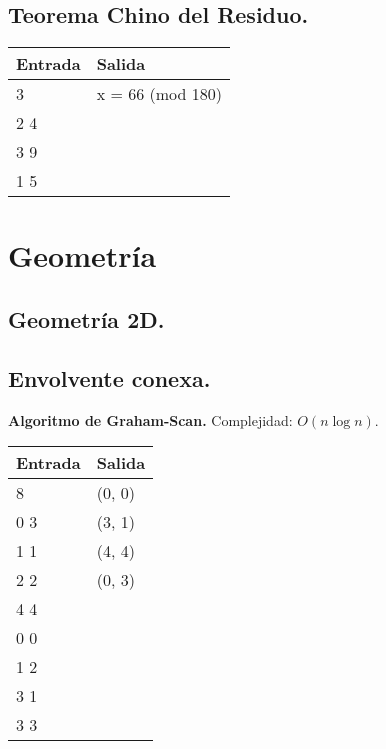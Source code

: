 \documentclass[10pt, letterpaper, twoside]{article}
\begin{document}
\subsection{Teorema Chino del Residuo.}



\begin{tabular}{|p{7cm}|p{7cm}|}
\hline
\textbf{Entrada} & \textbf{Salida}\\ \hline
3   & x = 66 (mod 180)\\
2 4 & \\ 
3 9 & \\ 
1 5 & \\ \hline
\end{tabular}\bigskip


\section{Geometría}

\subsection{Geometría 2D.}



\subsection{Envolvente conexa.}

\textbf{Algoritmo de Graham-Scan.} Complejidad: $O(n \log n)$.



\begin{tabular}{|p{7cm}|p{7cm}|}
\hline
\textbf{Entrada} & \textbf{Salida}\\ \hline
8   & (0, 0) \\
0 3 & (3, 1) \\
1 1 & (4, 4) \\
2 2 & (0, 3) \\
4 4 & \\
0 0 & \\
1 2 & \\
3 1 & \\
3 3 & \\ \hline
\end{tabular}
\end{document}
